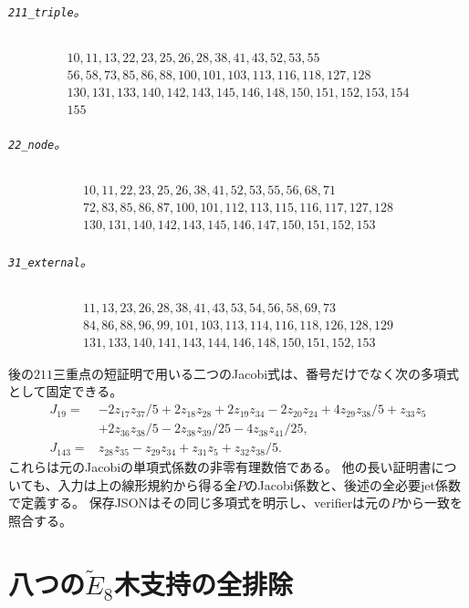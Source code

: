 \documentclass[11pt,a4paper]{ltjsarticle}
\theoremstyle{remark}\newtheorem{remark}[theorem]{注意}
\begin{document}
\paragraph{\texttt{211\_triple}。}
\[\begin{gathered}
10,11,13,22,23,25,26,28,38,41,43,52,53,55\\
56,58,73,85,86,88,100,101,103,113,116,118,127,128\\
130,131,133,140,142,143,145,146,148,150,151,152,153,154\\
155
\end{gathered}\]


\paragraph{\texttt{22\_node}。}
\[\begin{gathered}
10,11,22,23,25,26,38,41,52,53,55,56,68,71\\
72,83,85,86,87,100,101,112,113,115,116,117,127,128\\
130,131,140,142,143,145,146,147,150,151,152,153
\end{gathered}\]


\paragraph{\texttt{31\_external}。}
\[\begin{gathered}
11,13,23,26,28,38,41,43,53,54,56,58,69,73\\
84,86,88,96,99,101,103,113,114,116,118,126,128,129\\
131,133,140,141,143,144,146,148,150,151,152,153
\end{gathered}\]


後の$211$三重点の短証明で用いる二つのJacobi式は、番号だけでなく次の多項式として固定できる。
\begin{align*}
J_{19}={}&-2z_{17}z_{37}/5+2z_{18}z_{28}+2z_{19}z_{34}-2z_{20}z_{24}
+4z_{29}z_{38}/5+z_{33}z_5\\
&+2z_{36}z_{38}/5-2z_{38}z_{39}/25-4z_{38}z_{41}/25,\\
J_{143}={}&z_{28}z_{35}-z_{29}z_{34}+z_{31}z_5+z_{32}z_{38}/5.
\end{align*}
これらは元のJacobiの単項式係数の非零有理数倍である。
他の長い証明書についても、入力は上の線形規約から得る全$P$のJacobi係数と、後述の全必要jet係数で定義する。
保存JSONはその同じ多項式を明示し、verifierは元の$P$から一致を照合する。


\part{八つの\texorpdfstring{$\widetilde E_8$}{E8}木支持の全排除}
\end{document}

